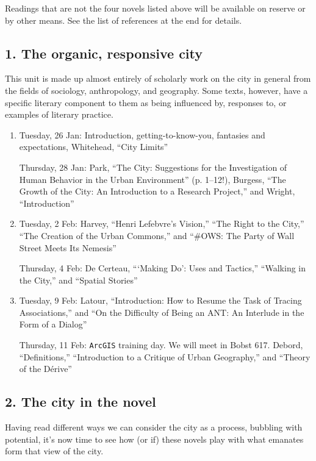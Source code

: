 Readings that are not the four novels listed above will be available on reserve
or by other means. See the list of references at the end for details.

\subsection*{1. The organic, responsive city}

  This unit is made up almost entirely of scholarly work on the city in general
  from the fields of sociology, anthropology, and geography. Some texts,
  however, have a specific literary component to them as being influenced by,
  responses to, or examples of literary practice. 

\begin{enumerate}

  \item Tuesday, 26 Jan: Introduction, getting-to-know-you, fantasies and expectations,
    Whitehead, “City Limits”

    Thursday, 28 Jan: Park, “The City: Suggestions for the Investigation of Human Behavior in the Urban Environment” (p. 1--12!), Burgess, “The Growth of the City: An Introduction to a Research Project,” and Wright, “Introduction”

  \item Tuesday, 2 Feb: Harvey, “Henri Lefebvre’s Vision,” “The Right to the City,” “The Creation of the Urban Commons,” and “\#OWS: The Party of Wall Street Meets Its Nemesis”

    Thursday, 4 Feb: De Certeau, “‘Making Do’: Uses and Tactics,” “Walking in the City,” and “Spatial Stories”

  \item Tuesday, 9 Feb: Latour, “Introduction: How to Resume the Task of Tracing Associations,” and “On the Difficulty of Being an ANT: An Interlude in the Form of a Dialog”

    Thursday, 11 Feb: \texttt{ArcGIS} training day. We will meet in Bobst 617. Debord, “Definitions,” “Introduction to a Critique of Urban Geography,” and “Theory of the Dérive”

\end{enumerate}

\subsection*{2. The city in the novel}

Having read different ways we can consider the city as a process, bubbling with
potential, it’s now time to see how (or if) these novels play with what
emanates form that view of the city.

